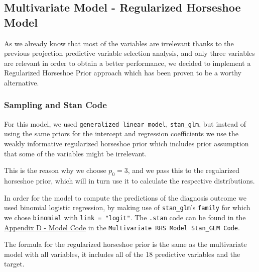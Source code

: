 \documentclass[
]{article}
\begin{document}
\hypertarget{multivariate-model---regularized-horseshoe-model}{%
\subsection{Multivariate Model - Regularized Horseshoe
Model}\label{multivariate-model---regularized-horseshoe-model}}

As we already know that most of the variables are irrelevant thanks to
the previous projection predictive variable selection analysis, and only
three variables are relevant in order to obtain a better performance, we
decided to implement a Regularized Horseshoe Prior approach which has
been proven to be a worthy alternative.

\hypertarget{sampling-and-stan-code-2}{%
\subsubsection{Sampling and Stan Code}\label{sampling-and-stan-code-2}}

For this model, we used \texttt{generalized\ linear\ model},
\texttt{stan\_glm}, but instead of using the same priors for the
intercept and regression coefficients we use the weakly informative
regularized horseshoe prior which includes prior assumption that some of
the variables might be irrelevant.

This is the reason why we choose \(p_0 = 3\), and we pass this to the
regularized horseshoe prior, which will in turn use it to calculate the
respective distributions.

In order for the model to compute the predictions of the diagnosis
outcome we used binomial logistic regression, by making use of
\texttt{stan\_glm}'s \texttt{family} for which we chose
\texttt{binomial} with \texttt{link\ =\ "logit"}. The \texttt{.stan}
code can be found in the \protect\hyperlink{apb}{Appendix D - Model
Code} in the \texttt{Multivariate\ RHS\ Model\ Stan\_GLM\ Code}.

The formula for the regularized horseshoe prior is the same as the
multivariate model with all variables, it includes all of the 18
predictive variables and the target.
\end{document}
